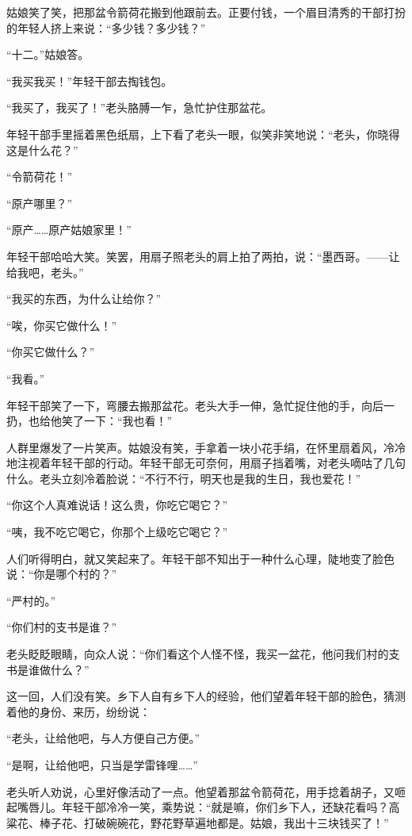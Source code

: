 \documentclass[12pt,UTF-8,openany]{ctexbook}
\begin{document}
\begin{large}
    姑娘笑了笑，把那盆令箭荷花搬到他跟前去。正要付钱，一个眉目清秀的干部打扮的年轻人挤上来说：“多少钱？多少钱？”
    
    “十二。”姑娘答。
    
    “我买我买！”年轻干部去掏钱包。
    
    “我买了，我买了！”老头胳膊一乍，急忙护住那盆花。
    
    年轻干部手里摇着黑色纸扇，上下看了老头一眼，似笑非笑地说：“老头，你晓得这是什么花？”
    
    “令箭荷花！”
    
    “原产哪里？”
    
    “原产……原产姑娘家里！”
    
    年轻干部哈哈大笑。笑罢，用扇子照老头的肩上拍了两拍，说：“墨西哥。——让给我吧，老头。”
    
    “我买的东西，为什么让给你？”
    
    “唉，你买它做什么！”
    
    “你买它做什么？”
    
    “我看。”
    
    年轻干部笑了一下，弯腰去搬那盆花。老头大手一伸，急忙捉住他的手，向后一扔，也给他笑了一下：“我也看！”
    
    人群里爆发了一片笑声。姑娘没有笑，手拿着一块小花手绢，在怀里扇着风，冷冷地注视着年轻干部的行动。年轻干部无可奈何，用扇子挡着嘴，对老头嘀咕了几句什么。老头立刻冷着脸说：“不行不行，明天也是我的生日，我也爱花！”
    
    “你这个人真难说话！这么贵，你吃它喝它？”
    
    “咦，我不吃它喝它，你那个上级吃它喝它？”
    
    人们听得明白，就又笑起来了。年轻干部不知出于一种什么心理，陡地变了脸色说：“你是哪个村的？”
    
    “严村的。”
    
    “你们村的支书是谁？”
    
    老头眨眨眼睛，向众人说：“你们看这个人怪不怪，我买一盆花，他问我们村的支书是谁做什么？”
    
    这一回，人们没有笑。乡下人自有乡下人的经验，他们望着年轻干部的脸色，猜测着他的身份、来历，纷纷说：
    
    “老头，让给他吧，与人方便自己方便。”
    
    “是啊，让给他吧，只当是学雷锋哩……”
    
    老头听人劝说，心里好像活动了一点。他望着那盆令箭荷花，用手捻着胡子，又咂起嘴唇儿。年轻干部冷冷一笑，乘势说：“就是嘛，你们乡下人，还缺花看吗？高粱花、棒子花、打破碗碗花，野花野草遍地都是。姑娘，我出十三块钱买了！”
    

\end{large}
\end{document}
